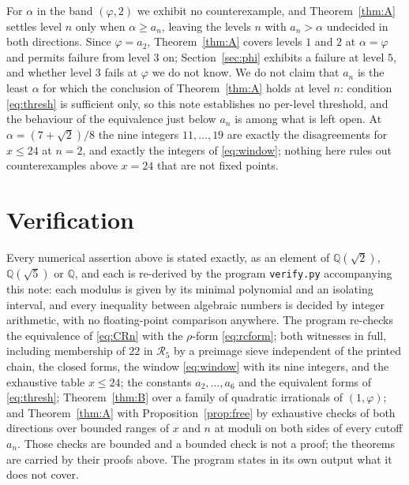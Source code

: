 \documentclass[11pt]{amsart}
\theoremstyle{remark}
\begin{document}
For $\alpha$ in the band $(\varphi,2)$ we exhibit no counterexample, and
Theorem~\ref{thm:A} settles level $n$ only when $\alpha\ge a_n$, leaving the levels $n$
with $a_n>\alpha$ undecided in both directions. Since $\varphi=a_2$,
Theorem~\ref{thm:A} covers levels $1$ and $2$ at $\alpha=\varphi$ and permits failure
from level $3$ on; Section~\ref{sec:phi} exhibits a failure at level $5$, and whether
level $3$ fails at $\varphi$ we do not know. We do not claim that $a_n$ is the least
$\alpha$ for which the conclusion of Theorem~\ref{thm:A} holds at level $n$: condition
\eqref{eq:thresh} is sufficient only, so this note establishes no per-level threshold,
and the behaviour of the equivalence just below $a_n$ is among what is left open. At
$\alpha=(7+\sqrt2)/8$ the nine integers $11,\dots,19$ are exactly the disagreements for
$x\le24$ at $n=2$, and exactly the integers of \eqref{eq:window}; nothing here rules out
counterexamples above $x=24$ that are not fixed points.

\section{Verification}

Every numerical assertion above is stated exactly, as an element of
$\mathbb Q(\sqrt2)$, $\mathbb Q(\sqrt5)$ or $\mathbb Q$, and each is re-derived by
the program \texttt{verify.py} accompanying this note: each modulus is given by its
minimal polynomial and an isolating interval, and every inequality between algebraic
numbers is decided by integer arithmetic, with no floating-point comparison anywhere.
The program re-checks the equivalence of \eqref{eq:CRn} with the $\rho$-form
\eqref{eq:rcform}; both witnesses in full, including membership of $22$ in
$\mathcal R_5$ by a preimage sieve independent of the printed chain, the closed forms,
the window \eqref{eq:window} with its nine integers, and the exhaustive table $x\le24$;
the constants $a_2,\dots,a_6$ and the equivalent forms of \eqref{eq:thresh};
Theorem~\ref{thm:B} over a family of quadratic irrationals of $(1,\varphi)$; and
Theorem~\ref{thm:A} with Proposition~\ref{prop:free} by exhaustive checks of both
directions over bounded ranges of $x$ and $n$ at moduli on both sides of every cutoff
$a_n$. Those checks are bounded and a bounded check is not a proof; the theorems are
carried by their proofs above. The program states in its own output what it does not
cover.
\end{document}
